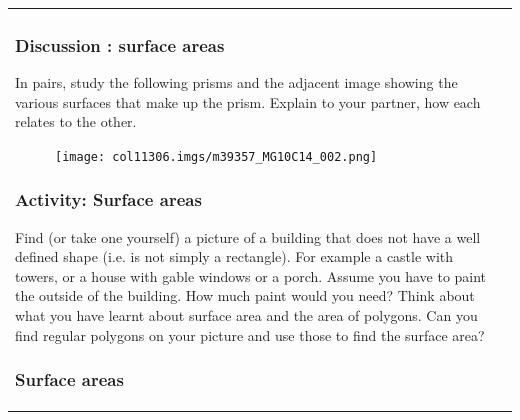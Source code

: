 {{\begin{tabular*}{\mytablewidth}[t]{|p{10\mystarwidth}|p{10\mystarwidth}|}
            \subsubsection{  Discussion : surface areas }
            \nopagebreak
            
        \label{m39357*id62753}In pairs, study the following prisms and the adjacent image showing the various surfaces that make up the prism. Explain to your partner, how each relates to the other.\par 
        
        \label{m39357*id6274366}
    \setcounter{subfigure}{0}


	\begin{figure}[H] %
    \begin{center}
    \label{m39357*id62767!!!underscore!!!media}\label{m39357*id62767!!!underscore!!!printimage}\texttt{[image: col11306.imgs/m39357\_MG10C14\_002.png]} %
        
      \vspace{2pt}
    \vspace{.1in}
    
    \end{center}

 \end{figure}   

    \addtocounter{footnote}{-0}
    
 \par 

\label{m39357*eip-630}
            \subsubsection{ Activity: Surface areas}
            \nopagebreak
            \label{m39357*eip-802}
Find (or take one yourself) a picture of a building that does not have a well defined shape (i.e. is not simply a rectangle). For example a castle with towers, or a house with gable windows or a porch. Assume you have to paint the outside of the building. How much paint would you need? Think about what you have learnt about surface area and the area of polygons. Can you find regular polygons on your picture and use those to find the surface area?
\par \label{m39357*secfhsst!!!underscore!!!id113}
            \subsubsection{  Surface areas }
            \nopagebreak
            

\end{tabular*}}}
